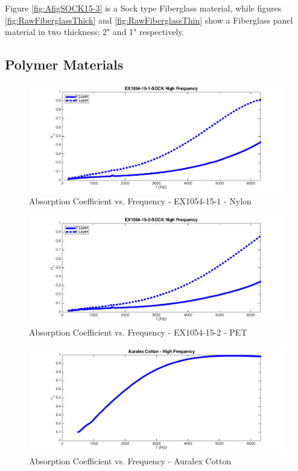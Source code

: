 Figure \ref{fig:AfigSOCK15-3} is a Sock type Fiberglass material, while figures \ref{fig:RawFiberglassThick} and \ref{fig:RawFiberglassThin} show a Fiberglass panel material in two thickness; 2" and 1" respectively.

\subsection{Polymer Materials}
\begin{figure}[hbtp]
    \centering
    \includegraphics[width=1\textwidth]{Chapter-4/figs/AfigSOCK15-1}
    \caption{Absorption Coefficient vs. Frequency - EX1054-15-1 - Nylon}
    \label{fig:AfigSOCK15-1}
\end{figure}

\begin{figure}[hbtp]
    \centering
    \includegraphics[width=1\textwidth]{Chapter-4/figs/AfigSOCK15-2}
    \caption{Absorption Coefficient vs. Frequency - EX1054-15-2 - PET}
    \label{fig:AfigSOCK15-2}
\end{figure}

\begin{figure}[hbtp]
    \centering
    \includegraphics[width=1\textwidth]{Chapter-4/figs/AuralexCotton}
    \caption{Absorption Coefficient vs. Frequency - Auralex Cotton}
    \label{fig:AuralexCotton}
\end{figure}

